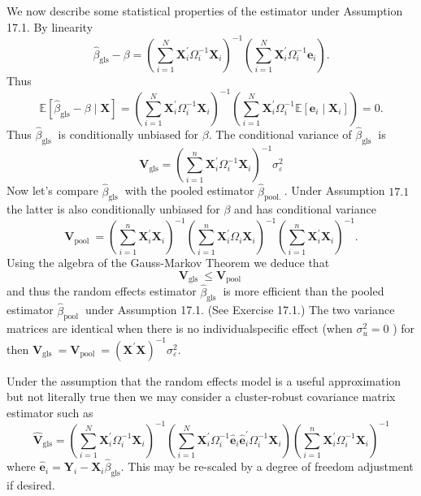 \documentclass[10pt]{article}
\begin{document}
We now describe some statistical properties of the estimator under Assumption 17.1. By linearity
$$
\widehat{\beta}_{\mathrm{gls}}-\beta=\left(\sum_{i=1}^{N} \boldsymbol{X}_{i}^{\prime} \Omega_{i}^{-1} \boldsymbol{X}_{i}\right)^{-1}\left(\sum_{i=1}^{N} \boldsymbol{X}_{i}^{\prime} \Omega_{i}^{-1} \boldsymbol{e}_{i}\right) .
$$
Thus
$$
\mathbb{E}\left[\widehat{\beta}_{\mathrm{gls}}-\beta \mid \boldsymbol{X}\right]=\left(\sum_{i=1}^{N} \boldsymbol{X}_{i}^{\prime} \Omega_{i}^{-1} \boldsymbol{X}_{i}\right)^{-1}\left(\sum_{i=1}^{N} \boldsymbol{X}_{i}^{\prime} \Omega_{i}^{-1} \mathbb{E}\left[\boldsymbol{e}_{i} \mid \boldsymbol{X}_{i}\right]\right)=0 .
$$
Thus $\widehat{\beta}_{\text {gls }}$ is conditionally unbiased for $\beta$. The conditional variance of $\widehat{\beta}_{\text {gls }}$ is
$$
\boldsymbol{V}_{\mathrm{gls}}=\left(\sum_{i=1}^{n} \boldsymbol{X}_{i}^{\prime} \Omega_{i}^{-1} \boldsymbol{X}_{i}\right)^{-1} \sigma_{\varepsilon}^{2}
$$
Now let's compare $\widehat{\beta}_{\text {gls }}$ with the pooled estimator $\widehat{\beta}_{\text {pool. }}$. Under Assumption $17.1$ the latter is also conditionally unbiased for $\beta$ and has conditional variance
$$
\boldsymbol{V}_{\text {pool }}=\left(\sum_{i=1}^{n} \boldsymbol{X}_{i}^{\prime} \boldsymbol{X}_{i}\right)^{-1}\left(\sum_{i=1}^{n} \boldsymbol{X}_{i}^{\prime} \Omega_{i} \boldsymbol{X}_{i}\right)^{-1}\left(\sum_{i=1}^{n} \boldsymbol{X}_{i}^{\prime} \boldsymbol{X}_{i}\right)^{-1} .
$$
Using the algebra of the Gauss-Markov Theorem we deduce that
$$
\boldsymbol{V}_{\text {gls }} \leq \boldsymbol{V}_{\text {pool }}
$$
and thus the random effects estimator $\widehat{\beta}_{\text {gls }}$ is more efficient than the pooled estimator $\widehat{\beta}_{\text {pool }}$ under Assumption 17.1. (See Exercise 17.1.) The two variance matrices are identical when there is no individualspecific effect (when $\sigma_{u}^{2}=0$ ) for then $\boldsymbol{V}_{\text {gls }}=\boldsymbol{V}_{\text {pool }}=\left(\boldsymbol{X}^{\prime} \boldsymbol{X}\right)^{-1} \sigma_{\varepsilon}^{2}$.

Under the assumption that the random effects model is a useful approximation but not literally true then we may consider a cluster-robust covariance matrix estimator such as
$$
\widehat{\boldsymbol{V}}_{\mathrm{gls}}=\left(\sum_{i=1}^{N} \boldsymbol{X}_{i}^{\prime} \Omega_{i}^{-1} \boldsymbol{X}_{i}\right)^{-1}\left(\sum_{i=1}^{N} \boldsymbol{X}_{i}^{\prime} \Omega_{i}^{-1} \widehat{\boldsymbol{e}}_{i} \widehat{\boldsymbol{e}}_{i}^{\prime} \Omega_{i}^{-1} \boldsymbol{X}_{i}\right)\left(\sum_{i=1}^{n} \boldsymbol{X}_{i}^{\prime} \Omega_{i}^{-1} \boldsymbol{X}_{i}\right)^{-1}
$$
where $\widehat{\boldsymbol{e}}_{i}=\boldsymbol{Y}_{i}-\boldsymbol{X}_{i} \widehat{\beta}_{\mathrm{gls}}$. This may be re-scaled by a degree of freedom adjustment if desired.
\end{document}
